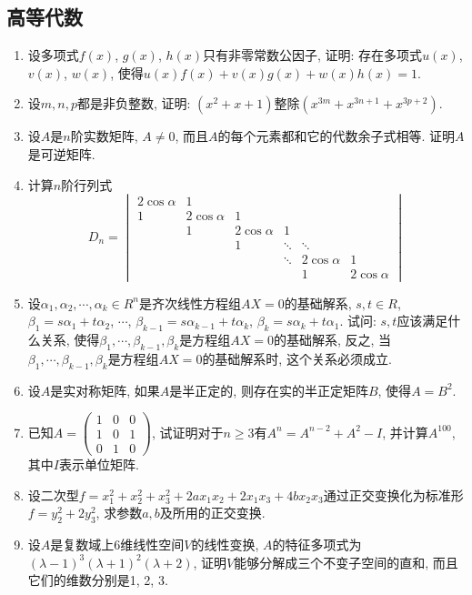 \documentclass[12pt,a4paper,openany]{book}
\begin{document}
\subsection{高等代数}
\begin{enumerate}
\item 设多项式$f(x)$, $g(x)$, $h(x)$只有非零常数公因子, 证明: 存在多项式$u(x)$, $v(x)$, $w(x)$, 使得$u(x)f(x) + v(x)g(x) + w(x)h(x) = 1$.

\item 设$m, n, p$都是非负整数, 证明: $(x^2 +x + 1)$整除$(x^{3m} + x^{3n+1} + x^{3p+2})$.

\item 设$A$是$n$阶实数矩阵, $A \neq 0$, 而且$A$的每个元素都和它的代数余子式相等. 证明$A$是可逆矩阵.

\item 计算$n$阶行列式
\[
D_n = \begin{vmatrix}
2\cos\alpha & 1 & &  & & \\
1 & 2\cos\alpha & 1 &&& \\
&1 & 2\cos\alpha & 1 && \\
&&1 &\ddots & \ddots & \\
&&& \ddots & 2\cos\alpha & 1 \\
&&&& 1 & 2\cos\alpha
\end{vmatrix}
\]

\item 设$\alpha_1, \alpha_2, \cdots, \alpha_k \in R^n$是齐次线性方程组$AX = 0$的基础解系, $s, t \in R$, $\beta_1 = s\alpha_1 + t\alpha_2$, $\cdots$, $\beta_{k-1} = s\alpha_{k-1} + t\alpha_k$, $\beta_k = s\alpha_k + t\alpha_1$. 试问: $s, t$应该满足什么关系, 使得$\beta_1, \cdots, \beta_{k-1}, \beta_k$是方程组$AX = 0$的基础解系, 反之, 当$\beta_1, \cdots, \beta_{k-1}, \beta_k$是方程组$AX = 0$的基础解系时, 这个关系必须成立.

\item 设$A$是实对称矩阵, 如果$A$是半正定的, 则存在实的半正定矩阵$B$, 使得$A = B^2$.

\item 已知$A = \begin{pmatrix} 1 & 0 & 0 \\ 1 & 0 & 1 \\ 0 & 1 & 0 \end{pmatrix}$, 试证明对于$n \ge 3$有$A^n = A^{n-2} + A^2 - I$, 并计算$A^{100}$, 其中$I$表示单位矩阵.

\item 设二次型$f = x_1^2 + x_2^2 + x_3^2 + 2ax_1x_2 + 2x_1x_3 + 4bx_2x_3$通过正交变换化为标准形$f = y_2^2 + 2y_3^2$, 求参数$a, b$及所用的正交变换.

\item 设$A$是复数域上6维线性空间$V$的线性变换, $A$的特征多项式为$(\lambda - 1)^3(\lambda + 1)^2(\lambda + 2)$, 证明$V$能够分解成三个不变子空间的直和, 而且它们的维数分别是1, 2, 3.

\end{enumerate}
\end{document}
